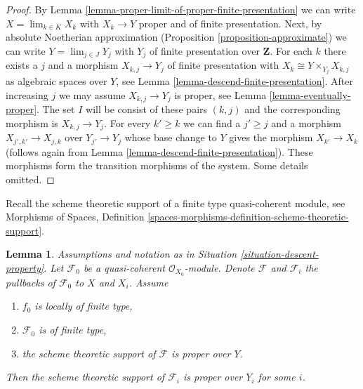 \documentclass{stacks-project}
\theoremstyle{plain}
\newtheorem{lemma}[subsection]{Lemma}
\theoremstyle{definition}
\theoremstyle{remark}
\numberwithin{equation}{subsection}
\def\lim{\mathop{\mathrm{lim}}\nolimits}
\begin{document}
\begin{proof}
By Lemma \ref{lemma-proper-limit-of-proper-finite-presentation}
we can write $X = \lim_{k \in K} X_k$ with $X_k \to Y$ proper and
of finite presentation. Next, by absolute Noetherian approximation
(Proposition \ref{proposition-approximate}) we can
write $Y = \lim_{j \in J} Y_j$ with $Y_j$ of finite presentation
over $\mathbf{Z}$.
For each $k$ there exists a $j$ and a morphism $X_{k, j} \to Y_j$
of finite presentation with $X_k \cong Y \times_{Y_j} X_{k, j}$
as algebraic spaces over $Y$, see
Lemma \ref{lemma-descend-finite-presentation}.
After increasing $j$ we may assume $X_{k, j} \to Y_j$ is proper, see
Lemma \ref{lemma-eventually-proper}. The set $I$ will be consist
of these pairs $(k, j)$ and the corresponding morphism is $X_{k, j} \to Y_j$.
For every $k' \geq k$ we can find a $j' \geq j$ and a morphism
$X_{j', k'} \to X_{j, k}$ over $Y_{j'} \to Y_j$ whose base change to $Y$
gives the morphism $X_{k'} \to X_k$ (follows again from
Lemma \ref{lemma-descend-finite-presentation}).
These morphisms form the transition morphisms of the system. Some details
omitted.
\end{proof}

\noindent
Recall the scheme theoretic support of
a finite type quasi-coherent module, see
Morphisms of Spaces, Definition
\ref{spaces-morphisms-definition-scheme-theoretic-support}.

\begin{lemma}
\label{lemma-eventually-proper-support}
Assumptions and notation as in Situation \ref{situation-descent-property}.
Let $\mathcal{F}_0$ be a quasi-coherent $\mathcal{O}_{X_0}$-module.
Denote $\mathcal{F}$ and $\mathcal{F}_i$ the pullbacks of
$\mathcal{F}_0$ to $X$ and $X_i$. Assume
\begin{enumerate}
\item $f_0$ is locally of finite type,
\item $\mathcal{F}_0$ is of finite type,
\item the scheme theoretic support of $\mathcal{F}$ is proper over $Y$.
\end{enumerate}
Then the scheme theoretic support of $\mathcal{F}_i$ is proper over $Y_i$
for some $i$.
\end{lemma}
\end{document}
